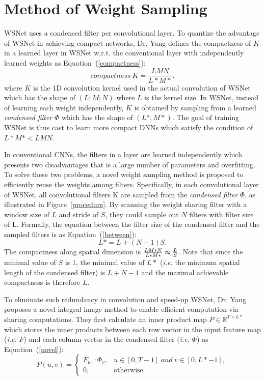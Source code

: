 \documentclass[10pt,twocolumn,letterpaper]{article}
\begin{document}
\section{Method of Weight Sampling}

WSNet uses a condensed filter per convolutional layer. To quantize the advantage of WSNet in achieving compact networks, Dr. Yang defines the compactness of $K$ in a learned layer in WSNet w.r.t. the conventional layer with independently learned weights as Equation~(\ref{compactness}):
\begin{equation}
compactness~K=\frac{L M N}{L*M*}.     \label{compactness}
\end{equation}
where $K$ is the 1D convolution kernel used in the actual convolution of WSNet which has the shape of $(L;M;N)$ where $L$ is the kernel size. In WSNet, instead of learning each weight independently, $K$ is obtained by sampling from a learned \emph{condensed filter} $\Phi$ which has the shape of $(L*,M*)$. The goal of training WSNet is thus cast to learn more compact DNNs which satisfy the condition of $L*M*<LMN$.

In conventional CNNs, the filters in a layer are learned independently which presents two disadvantages that is a large number of parameters and overfitting. To solve these two problems, a novel weight sampling method is proposed to efficiently reuse the weights among filters. Specifically, in each convolutional layer of WSNet, all convolutional filters K are sampled from the \emph{condensed filter} $\Phi$, as illustrated in Figure~\ref{procedure}. By scanning the weight sharing filter with a window size of $L$ and stride of $S$, they could sample out $N$ filters with filter size of L. Formally, the equation between the filter size of the condensed filter and the sampled filters is as Equation~(\ref{between}):
\begin{equation}
L*=L+(N-1)S.     \label{between}
\end{equation}
The compactness along spatial dimension is $\frac{LM*N}{L*M*}\thickapprox \frac{L}{S}$. Note that since the minimal value of $S$ is 1, the minimal value of $L*$ (\emph{i.e.} the minimum spatial length of the condensed filter) is $L+N-1$ and the maximal achievable compactness is therefore $L$.

To eliminate such redundancy in convolution and speed-up WSNet, Dr. Yang proposes a novel integral image method to enable efficient computation via sharing computations. They first calculate an inner product map $P\in \mathbb{R}^{T\times L*}$ which stores the inner products between each row vector in the input feature map (\emph{i.e.} $F$) and each column vector in the condensed filter (\emph{i.e.} $\Phi$) as Equation~(\ref{novel}):
\begin{equation}
P(u,v)=
\begin{cases}
F_u,:\Phi_v, & u\in[0,T-1]~and~v\in [ 0,L*-1], \\
0, & \mbox{otherwise}.
\end{cases}      \label{novel}
\end{equation}
\end{document}
